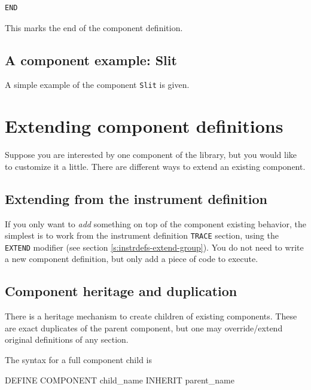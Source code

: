\begin{lstlisting}
END
\end{lstlisting}
This marks the end of the component definition.

\subsection{A component example: Slit}
\label{s:slit}
A simple example of the component \texttt{Slit} is given.



\section{Extending component definitions}
\label{s:compdefs-extend}

Suppose you are interested by one component of the \MCS library, but you would
like to customize it a little. There are different ways to extend an existing
component.

\subsection{Extending from the instrument definition}

If you only want to \emph{add} something on top of the component existing behavior, the simplest is to work from the instrument definition \texttt{TRACE} section, using the \texttt{EXTEND} modifier (see section \ref{s:instrdefs-extend-group}). You do not need to write a new component definition, but only add a piece of code to execute.

\subsection{Component heritage and duplication}

There is a heritage mechanism to create children of existing components. These
are exact duplicates of the parent component, but one may override/extend
original definitions of any section.

The syntax for a full component child is
\begin{mcstas}
DEFINE COMPONENT child_name INHERIT parent_name
\end{mcstas}

